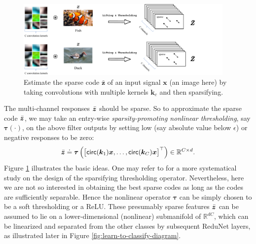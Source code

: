 \documentclass[../../book-main.tex]{subfiles}
\begin{document}
\begin{figure}[t]
	\centerline{
\includegraphics[width=0.95\textwidth]{figs_chap4/sparse-lifting.pdf}}
\caption{Estimate the sparse code $\bar{\bm z}$ of an input signal $\bm x$ (an image here) by taking convolutions with multiple kernels $\bm k_c$ and then sparsifying.}
		\label{fig:multi-channel-sparse-lifting}
\end{figure}
The multi-channel responses $\bar {\bm{z}}$ should be sparse. So to approximate the sparse code $\bar {\bm{z}}$, we may take an entry-wise {\em sparsity-promoting nonlinear thresholding}, say $\bm \tau(\cdot)$, on the above filter outputs by setting low (say absolute value below $\epsilon$) or negative  responses to be zero:
\begin{equation}
\bar {\bm{z}} \doteq \bm \tau \left( \big[\mathsf{circ}(\bm k_1) \bm{x}, \ldots, \mathsf{circ}(\bm k_C) \bm{x} \big]^\top \right) \in \mathbb{R}^{C \times d}.
\label{eqn:sparse-lifting}
\end{equation} 
Figure \ref{fig:multi-channel-sparse-lifting} illustrates the basic ideas. One may refer to \cite{Analysis-Filter} for a more systematical study on the design of the sparsifying thresholding operator. Nevertheless, here we are not so interested in obtaining the best sparse codes as long as the codes are sufficiently separable. Hence the nonlinear operator $\bm \tau$ can be simply chosen to be a soft thresholding or a ReLU. 
These presumably sparse features $\bar {\bm{z}}$ can be assumed to lie on a lower-dimensional (nonlinear) submanifold of $\mathbb{R}^{dC}$, which can be linearized and separated from the other classes by subsequent ReduNet layers, as illustrated later in Figure \ref{fig:learn-to-classify-diagram}. 
\end{document}
